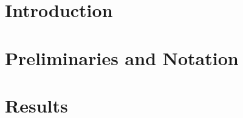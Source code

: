 \documentclass[preprint,12pt,authoryear]{elsarticle}
\begin{document}

\section{Introduction}
\label{sec:intro}

\section{Preliminaries and Notation}
\label{sec:Preliminaries}

\section{Results}
\label{sec:Results}


%
\end{document}
